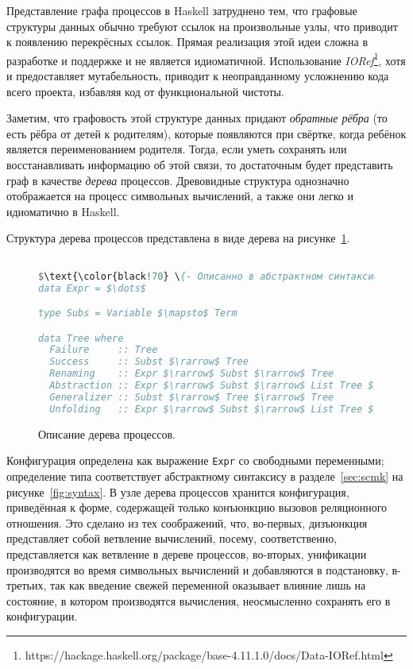 
Представление графа процессов в Haskell затруднено тем, что графовые
структуры данных обычно требуют ссылок на произвольные узлы,
что приводит к появлению перекрёсных ссылок. Прямая реализация этой
идеи сложна в разработке и поддержке и не является идиоматичной.
Использование \emph{IORef}\footnote{https://hackage.haskell.org/package/base-4.11.1.0/docs/Data-IORef.html},
хотя и предоставляет мутабельность, приводит к неоправданному усложнению кода всего проекта,
избавляя код от функциональной чистоты.

Заметим, что графовость этой структуре данных придают \emph{обратные рёбра}
(то есть рёбра от детей к родителям), которые появляются при свёртке, когда ребёнок
является переименованием родителя.
Тогда, если уметь сохранять или восстанавливать информацию об этой связи, то
достаточным будет представить граф в качестве \emph{дерева} процессов.
Древовидные структура однозначно отображается на процесс символьных вычислений,
а также они легко и идиоматично в Haskell.

Структура дерева процессов представлена в виде дерева на рисунке~\ref{fig:ptree}.

\begin{figure}[h!]
\begin{lstlisting}[mathescape,language=Haskell,extendedchars=\true,frame=single,basicstyle=\ttfamily]

$\text{\color{black!70} \{- Описанно в абстрактном синтаксисе \ukanren -\}}$
data Expr = $\dots$

type Subs = Variable $\mapsto$ Term

data Tree where
  Failure     :: Tree
  Success     :: Subst $\rarrow$ Tree
  Renaming    :: Expr $\rarrow$ Subst $\rarrow$ Tree
  Abstraction :: Expr $\rarrow$ Subst $\rarrow$ List Tree $\rarrow$ Tree
  Generalizer :: Subst $\rarrow$ Tree $\rarrow$ Tree
  Unfolding   :: Expr $\rarrow$ Subst $\rarrow$ List Tree $\rarrow$ Tree
\end{lstlisting}
\caption{Описание дерева процессов.}
\label{fig:ptree}
\end{figure}

Конфигурация определена как выражение \lstinline{Expr} со свободными переменными;
определение типа соответствует абстрактному синтаксису в разделе~\ref{sec:scmk} на рисунке~\ref{fig:syntax}.
В узле дерева процессов хранится конфигурация, приведённая к форме, содержащей только конъюнкцию вызовов
реляционного отношения. Это сделано из тех соображений, что, во-первых, дизъюнкция представляет
собой ветвление вычислений, посему, соответственно, представляется как ветвление в дереве процессов,
во-вторых, унификации производятся во время символьных вычислений и добавляются в подстановку,
в-третьих, так как введение свежей переменной оказывает влияние лишь на состояние, в котором производятся вычисления,
неосмысленно сохранять его в конфигурации.

